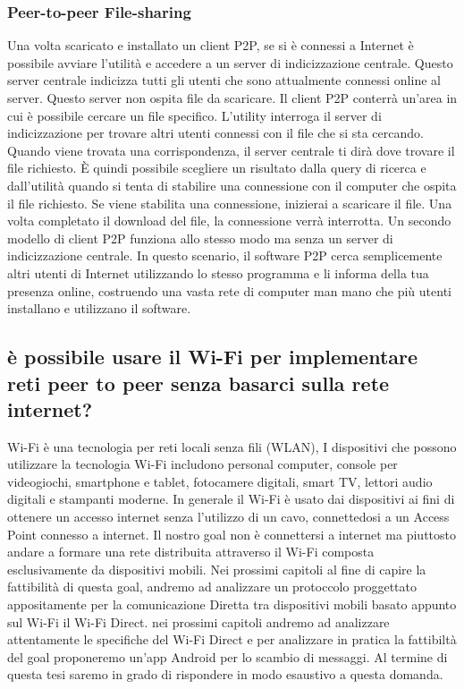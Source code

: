\subsubsection{Peer-to-peer File-sharing}
Una volta scaricato e installato un client P2P, se si è connessi a Internet è
possibile avviare l'utilità e accedere a un server di indicizzazione centrale.
Questo server centrale indicizza tutti gli utenti che sono attualmente connessi
online al server. Questo server non ospita file da scaricare. Il client P2P
conterrà un'area in cui è possibile cercare un file specifico. L'utility
interroga il server di indicizzazione per trovare altri utenti connessi con il
file che si sta cercando. Quando viene trovata una corrispondenza, il server
centrale ti dirà dove trovare il file richiesto. È quindi possibile scegliere
un risultato dalla query di ricerca e dall'utilità quando si tenta di stabilire
una connessione con il computer che ospita il file richiesto. Se viene
stabilita una connessione, inizierai a scaricare il file. Una volta completato
il download del file, la connessione verrà interrotta.
Un secondo modello di client P2P funziona allo stesso modo ma senza un server
di indicizzazione centrale. In questo scenario, il software P2P cerca
semplicemente altri utenti di Internet utilizzando lo stesso programma e li
informa della tua presenza online, costruendo una vasta rete di computer man
mano che più utenti installano e utilizzano il software.

\subsection{è possibile usare il Wi-Fi per 
implementare reti peer to peer senza basarci sulla rete internet?}

Wi-Fi  è una tecnologia per reti locali senza
fili (WLAN),  %
I dispositivi che possono utilizzare la tecnologia Wi-Fi includono 
personal computer, console per videogiochi, smartphone e tablet,
fotocamere digitali, smart TV, lettori audio digitali e stampanti moderne.
In generale il Wi-Fi è usato dai dispositivi 
ai fini di ottenere un accesso internet senza l'utilizzo di un cavo,
connettedosi a un Access Point connesso a internet.
Il nostro goal non è connettersi a internet ma piuttosto andare
a formare una rete distribuita attraverso il Wi-Fi 
composta esclusivamente da dispositivi mobili.
Nei prossimi capitoli al fine di capire la fattibilità
di questa goal,
andremo ad analizzare un protoccolo
proggettato appositamente per la comunicazione Diretta 
tra dispositivi mobili basato appunto sul Wi-Fi il Wi-Fi Direct.
nei prossimi capitoli andremo ad analizzare attentamente 
le specifiche del Wi-Fi Direct e per analizzare in pratica 
la fattibiltà del goal proponeremo un'app Android per 
lo scambio di messaggi.
Al termine di questa tesi saremo in
grado di rispondere in modo esaustivo a questa domanda.





